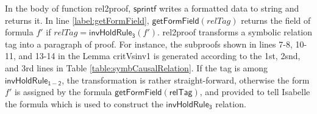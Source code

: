 \documentclass[conference]{IEEEtran}
\begin{document}
{In the body of function {\sf rel2proof},  $\mathsf{sprintf}$ writes a formatted data to string and returns it.
In line \ref{label:getFormField}, $\mathsf{getFormField}(relTag)$ returns the field of formula $f'$ if $relTag=\mathsf{invHoldRule_3}(f')$.  {\sf rel2proof} transforms a symbolic relation tag into a paragraph of proof. For instance, the subproofs shown in lines 7-8, 10-11, and 13-14 in the Lemma {\sf critVsinv1} is generated according to the 1st, 2snd, and 3rd lines in Table \ref{table:symbCausalRelation}.  %
If the tag is among $\mathsf{invHoldRule_{1-2}}$, the transformation is rather straight-forward, otherwise the form $f'$ is assigned by the formula $\mathsf{getFormField(relTag)}$, and provided to tell Isabelle the formula which is used to construct the $\mathsf{invHoldRule_3}$ relation.



}
\end{document}
